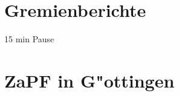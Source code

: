 \documentclass[compress, aspectratio=169]{beamer}
\begin{document}
	\section{Gremienberichte}
	\begin{frame}{\insertsection}
		15 min Pause
	\end{frame}
	
	\section{ZaPF in G"ottingen}
	\begin{frame}{\insertsection}
	\end{frame}
	
	
\end{document}
